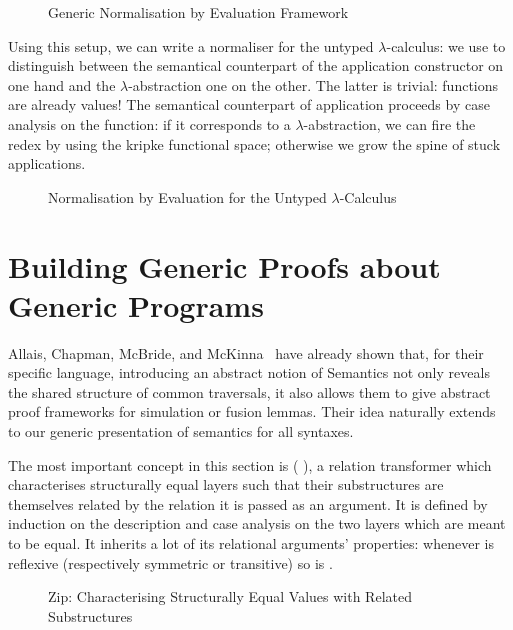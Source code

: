 \begin{figure}[h]
\caption{Generic Normalisation by Evaluation Framework}
\end{figure}

Using this setup, we can write a normaliser for the untyped
$\lambda$-calculus: we use  to distinguish between
the semantical counterpart of the application constructor on
one hand and the $\lambda$-abstraction one on the other.
The latter is trivial: functions are already
values! The semantical counterpart of application proceeds by
case analysis on the function: if it corresponds to a
$\lambda$-abstraction, we can fire the redex by using the kripke
functional space; otherwise we grow the spine of stuck
applications.


\begin{figure}[h]
\caption{Normalisation by Evaluation for the Untyped $\lambda$-Calculus}
\end{figure}


\section{Building Generic Proofs about Generic Programs}\label{section:simulation}

Allais, Chapman, McBride, and McKinna~\citeyear{allais2017type} have
already shown that, for their specific language, introducing an abstract
notion of Semantics not only reveals the shared structure of common
traversals, it also allows them to give abstract proof frameworks for
simulation or fusion lemmas. Their idea naturally extends to our generic
presentation of semantics for all syntaxes.

The most important concept in this section is ( ), a relation
transformer which characterises structurally equal layers such that their
substructures are themselves related by the relation it is passed as an
argument. It is defined by induction on the description and case analysis
on the two layers which are meant to be equal. It inherits a lot of its
relational arguments' properties: whenever  is reflexive (respectively
symmetric or transitive) so is   .

\begin{figure}[h]
\caption{Zip: Characterising Structurally Equal Values with Related Substructures}
\end{figure}

